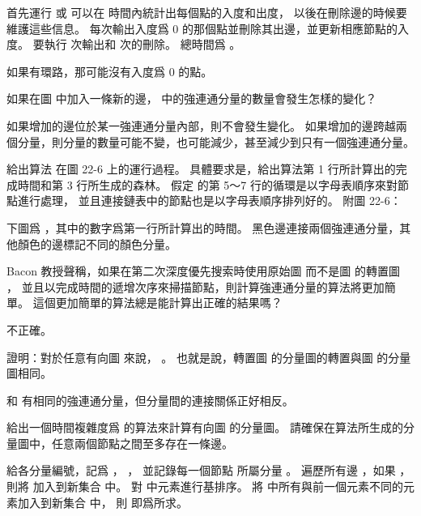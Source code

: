 \startANSWER
首先運行  或  可以在  時間內統計出每個點的入度和出度，
以後在刪除邊的時候要維護這些信息。
每次輸出入度爲 0 的那個點並刪除其出邊，並更新相應節點的入度。
要執行  次輸出和  次的刪除。
總時間爲 。

如果有環路，那可能沒有入度爲 0 的點。
\stopANSWER

\stopsection

\startsection[
  title={Strongly connected components},
]

\startEXERCISE
如果在圖  中加入一條新的邊，  中的強連通分量的數量會發生怎樣的變化？
\stopEXERCISE

\startANSWER
如果增加的邊位於某一強連通分量內部，則不會發生變化。
如果增加的邊跨越兩個分量，則分量的數量可能不變，也可能減少，甚至減少到只有一個強連通分量。
\stopANSWER

\startEXERCISE
給出算法  在圖 22-6 上的運行過程。
具體要求是，給出算法第 1 行所計算出的完成時間和第 3 行所生成的森林。
假定  的第 5～7 行的循環是以字母表順序來對節點進行處理，
並且連接鏈表中的節點也是以字母表順序排列好的。
附圖 22-6：

\externalfigure[output/e22_3_2-1]
\stopEXERCISE

\startANSWER
下圖爲 ，其中的數字爲第一行所計算出的時間。
黑色邊連接兩個強連通分量，其他顏色的邊標記不同的顏色分量。

\externalfigure[output/e22_5_2-2]
\stopANSWER

\startEXERCISE
Bacon 教授聲稱，如果在第二次深度優先搜索時使用原始圖  而不是圖  的轉置圖 ，
並且以完成時間的遞增次序來掃描節點，則計算強連通分量的算法將更加簡單。
這個更加簡單的算法總是能計算出正確的結果嗎？
\stopEXERCISE

\startANSWER
不正確。
\stopANSWER

\startEXERCISE
證明：對於任意有向圖  來說， 。
也就是說，轉置圖  的分量圖的轉置與圖  的分量圖相同。
\stopEXERCISE

\startANSWER
{} 和  有相同的強連通分量，但分量間的連接關係正好相反。
\stopANSWER

\startEXERCISE
給出一個時間複雜度爲  的算法來計算有向圖  的分量圖。
請確保在算法所生成的分量圖中，任意兩個節點之間至多存在一條邊。
\stopEXERCISE

\startANSWER
給各分量編號，記爲 ， ，
並記錄每一個節點  所屬分量 。
遍歷所有邊 ，如果 ，則將  加入到新集合  中。
對  中元素進行基排序。
將  中所有與前一個元素不同的元素加入到新集合  中，
則  即爲所求。
\stopANSWER

